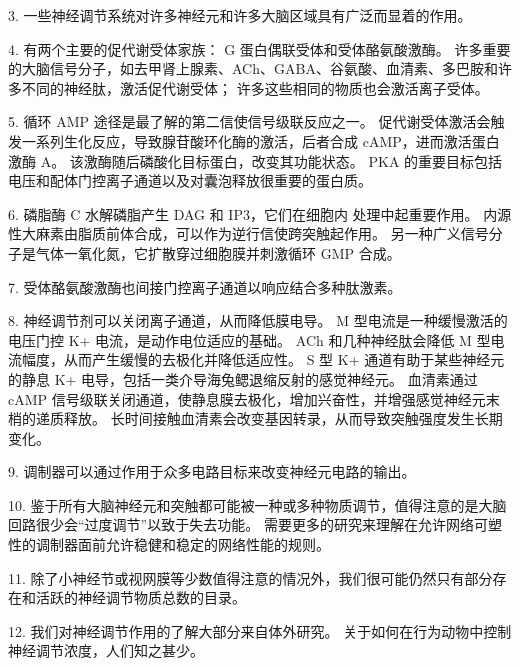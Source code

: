 3. 一些神经调节系统对许多神经元和许多大脑区域具有广泛而显着的作用。


4. 有两个主要的促代谢受体家族：
G 蛋白偶联受体和受体酪氨酸激酶。 
许多重要的大脑信号分子，如去甲肾上腺素、ACh、GABA、谷氨酸、血清素、多巴胺和许多不同的神经肽，激活促代谢受体；
许多这些相同的物质也会激活离子受体。 


5. 循环 AMP 途径是最了解的第二信使信号级联反应之一。
促代谢受体激活会触发一系列生化反应，导致腺苷酸环化酶的激活，后者合成 cAMP，进而激活蛋白激酶 A。
该激酶随后磷酸化目标蛋白，改变其功能状态。
PKA 的重要目标包括电压和配体门控离子通道以及对囊泡释放很重要的蛋白质。 


6. 磷脂酶 C 水解磷脂产生 DAG 和 IP3，它们在细胞内  处理中起重要作用。
内源性大麻素由脂质前体合成，可以作为逆行信使跨突触起作用。
另一种广义信号分子是气体一氧化氮，它扩散穿过细胞膜并刺激循环 GMP 合成。


7. 受体酪氨酸激酶也间接门控离子通道以响应结合多种肽激素。 


8. 神经调节剂可以关闭离子通道，从而降低膜电导。
M 型电流是一种缓慢激活的电压门控 K+ 电流，是动作电位适应的基础。
ACh 和几种神经肽会降低 M 型电流幅度，从而产生缓慢的去极化并降低适应性。
S 型 K+ 通道有助于某些神经元的静息 K+ 电导，包括一类介导海兔鳃退缩反射的感觉神经元。
血清素通过 cAMP 信号级联关闭通道，使静息膜去极化，增加兴奋性，并增强感觉神经元末梢的递质释放。
长时间接触血清素会改变基因转录，从而导致突触强度发生长期变化。 


9. 调制器可以通过作用于众多电路目标来改变神经元电路的输出。 


10. 鉴于所有大脑神经元和突触都可能被一种或多种物质调节，值得注意的是大脑回路很少会“过度调节”以致于失去功能。
需要更多的研究来理解在允许网络可塑性的调制器面前允许稳健和稳定的网络性能的规则。


11. 除了小神经节或视网膜等少数值得注意的情况外，我们很可能仍然只有部分存在和活跃的神经调节物质总数的目录。


12. 我们对神经调节作用的了解大部分来自体外研究。 关于如何在行为动物中控制神经调节浓度，人们知之甚少。





